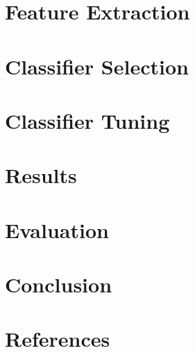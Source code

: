 \documentclass[12pt]{article}
\begin{document}
\begin{multicols}{2}
        \section{Feature Extraction}

        \section{Classifier Selection}

        \section{Classifier Tuning}

        \section{Results}

        \section{Evaluation}

        \section{Conclusion}

        \section{References}

    \end{multicols}
\end{document}
